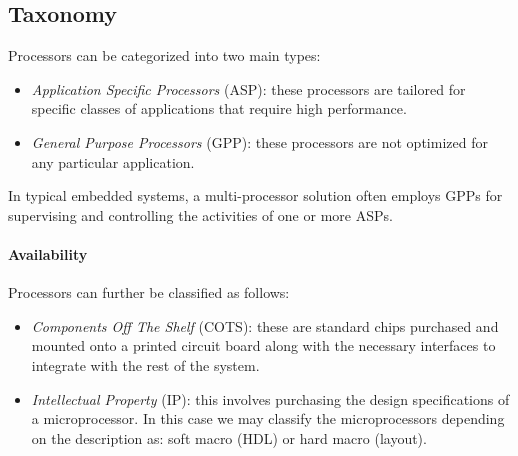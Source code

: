 \subsection{Taxonomy}
Processors can be categorized into two main types:
\begin{itemize}
    \item \textit{Application Specific Processors} (ASP): these processors are tailored for specific classes of applications that require high performance.
    \item \textit{General Purpose Processors} (GPP): these processors are not optimized for any particular application.
\end{itemize}
In typical embedded systems, a multi-processor solution often employs GPPs for supervising and controlling the activities of one or more ASPs.

\paragraph*{Availability}
Processors can further be classified as follows:
\begin{itemize}
    \item \textit{Components Off The Shelf} (COTS): these are standard chips purchased and mounted onto a printed circuit board along with the necessary interfaces to integrate with the rest of the system.
    \item \textit{Intellectual Property} (IP): this involves purchasing the design specifications of a microprocessor. 
        In this case we may classify the microprocessors depending on the description as: soft macro (HDL) or hard macro (layout). 
\end{itemize}

